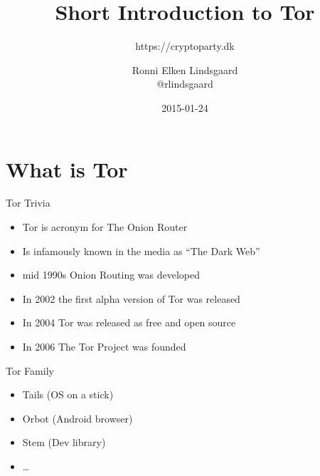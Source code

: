 \documentclass{beamer}
\title{Short Introduction to Tor}
\subtitle{https://cryptoparty.dk}
\author{Ronni Elken Lindsgaard \\ @rlindsgaard}
\date{2015-01-24}
\begin{document}
\begin{frame}
  \maketitle
\end{frame}

\begin{frame}
	\tableofcontents
\end{frame}

\section{What is Tor}
\begin{frame}{Tor Trivia}
	\begin{itemize}
		\item Tor is acronym for The Onion Router
		\item Is infamously known in the media as ``The Dark Web''
		\item mid 1990s Onion Routing was developed
		\item In 2002 the first alpha version of Tor was released
		\item In 2004 Tor was released as free and open source
		\item In 2006 The Tor Project was founded
	\end{itemize}
\end{frame}

\begin{frame}{Tor Family}
	\begin{itemize}
		\item Tails (OS on a stick)
		\item Orbot (Android browser)
		\item Stem (Dev library)
		\item \ldots
	\end{itemize}
\end{frame}
\end{document}
